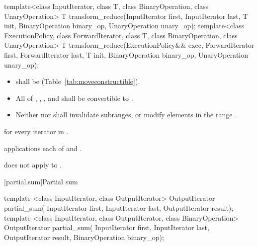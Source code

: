 %
\begin{itemdecl}
template<class InputIterator, class T,
         class BinaryOperation, class UnaryOperation>
  T transform_reduce(InputIterator first, InputIterator last, T init,
                     BinaryOperation binary_op, UnaryOperation unary_op);
template<class ExecutionPolicy,
         class ForwardIterator, class T,
         class BinaryOperation, class UnaryOperation>
  T transform_reduce(ExecutionPolicy&& exec,
                     ForwardIterator first, ForwardIterator last,
                     T init, BinaryOperation binary_op, UnaryOperation unary_op);
\end{itemdecl}

\begin{itemdescr}
\pnum
\requires
\begin{itemize}
\item {} shall be  (Table~\ref{tab:moveconstructible}).
\item All of ,
,
, and
 shall be convertible to
.
\item Neither  nor  shall invalidate subranges,
or modify elements in the range .
\end{itemize}

\pnum
\returns
{} for every
iterator  in .

\pnum
\complexity
{} applications each of  and
.

\pnum
\begin{note}
 does not apply  to .
\end{note}
\end{itemdescr}

[partial.sum]{Partial sum}

%
\begin{itemdecl}
template <class InputIterator, class OutputIterator>
  OutputIterator partial_sum(
    InputIterator first, InputIterator last,
    OutputIterator result);
template <class InputIterator, class OutputIterator, class BinaryOperation>
  OutputIterator partial_sum(
    InputIterator first, InputIterator last,
    OutputIterator result, BinaryOperation binary_op);
\end{itemdecl}

